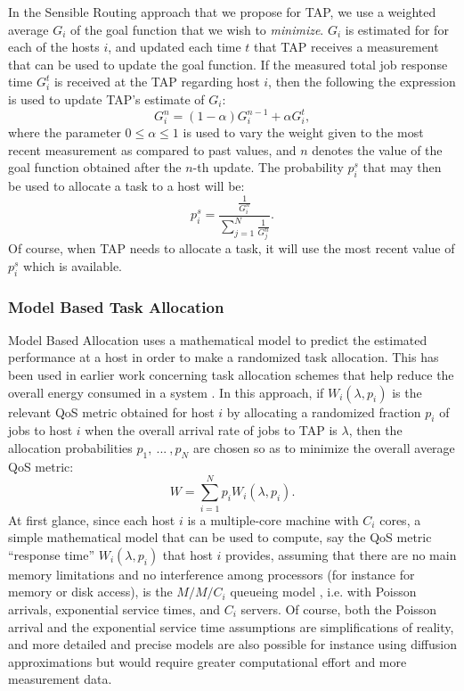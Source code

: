 \documentclass[journal]{IEEEtran}
\begin{document}
 In the Sensible Routing approach that we propose for TAP,  we use a weighted average $G_i$ of the goal function that we wish to {\em minimize}. $G_i$ is  estimated for
for each of the hosts $i$, and updated each time $t$ that TAP receives a measurement that can be used to update the goal function. If the measured total job response time $G_i^t$
is received at the TAP regarding host $i$, then the following the expression is used to update TAP's estimate of $G_i$:
\begin{equation}
G^{n}_i=(1-\alpha) G^{n-1}_i + \alpha G_i^t,
\end{equation}
where the parameter $0\leq \alpha\leq 1$ is used to vary the weight given to the most recent measurement as compared to past values, and $n$ denotes the value of the goal function obtained
after the $n$-th update. The probability $p_i^s$ that may then be used to allocate a task to a host will be:
\begin{equation}
p_i^s = \frac{\frac{1}{G^n_i}}{\sum_{j=1}^N\frac{1}{G^n_j}}. 
\end{equation}
Of course, when TAP needs to allocate a task, it will use the most recent value of $p_i^s$ which is available.

\subsubsection{Model Based Task Allocation} \label{math}

Model Based Allocation uses a mathematical model to predict the estimated performance at a host in order to make a randomized task allocation. This has been used in earlier work concerning
task allocation schemes that help reduce the overall energy consumed in a system \cite{thai13}. In this approach, if $W_i(\lambda,p_i)$ is the relevant QoS metric obtained
for host $i$ by allocating a randomized fraction $p_i$ of jobs to host $i$ when the overall arrival rate of jobs to TAP is $\lambda$, then the allocation probabilities $p_1,~...~,p_N$ are chosen so as to minimize the
overall average QoS metric:
\begin{equation}
W = \sum_{i=1}^N p_iW_i(\lambda,p_i).
\end{equation}
At first glance, since each host $i$ is a multiple-core machine with $C_i$ cores, a simple mathematical model that can be used to compute, say the QoS metric
``response time'' $W_i(\lambda,p_i)$ that host $i$ provides, assuming that there
are no main memory limitations and no interference among processors (for instance for memory or disk access), is the $M/M/C_i$ queueing model \cite{Gelenbe-Mitrani}, i.e. with Poisson arrivals, exponential service times, and $C_i$ servers. Of course, both the
Poisson arrival and the exponential service time assumptions are simplifications of reality, and more detailed and precise models are also possible for instance using
diffusion approximations \cite{Diffusion} but would require greater computational effort and more measurement data.
\end{document}
